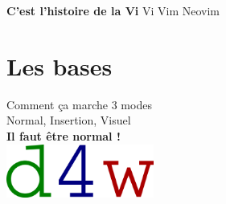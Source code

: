 \documentclass[10pt]{beamer}
\begin{document}
\begin{frame}{\textbf{C'est l'histoire de la Vi}}
	Vi \rightarrow Vim \rightarrow Neovim\\
	\vspace{20pt}

	\hspace{10pt}

\end{frame}

\section{Les bases}
	\begin{frame}{Comment ça marche}
		\center
		\huge 3 modes\\
		\vspace{5pt}
		\large Normal, Insertion, Visuel\\
		\vspace{10pt}
		\textbf{Il faut être normal !}\\
		\vspace{20pt}
		\includegraphics[height=50pt]{img/example.png}
	\end{frame}
\end{document}
